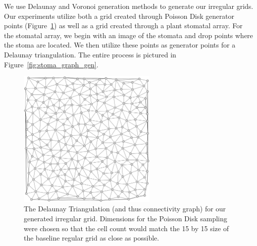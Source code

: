\documentclass[a4paper,11pt]{report}
\begin{document}
We use Delaunay and Voronoi generation methods to generate our irregular grids. Our experiments utilize both a grid created through Poisson Disk generator points (Figure~\ref{fig:lm_delaunay}) as well as a grid created through a plant stomatal array. For the stomatal array, we begin with an image of the stomata and drop points where the stoma are located. We then utilize these points as generator points for a Delaunay triangulation. The entire process is pictured in Figure~\ref{fig:stoma_graph_gen}.

\begin{figure}[htp]
\centering
\includegraphics[width=0.6\textwidth]{ch5_figs/lm_delaunay}
\caption[Irregular Delaunay Grid for Majority Task]{
  The Delaunay Triangulation (and thus connectivity graph) for our generated irregular grid. Dimensions for the Poisson Disk sampling were chosen so that the cell count would match the 15 by 15 size of the baseline regular grid as close as possible.
}
\label{fig:lm_delaunay}
\end{figure}
\end{document}
